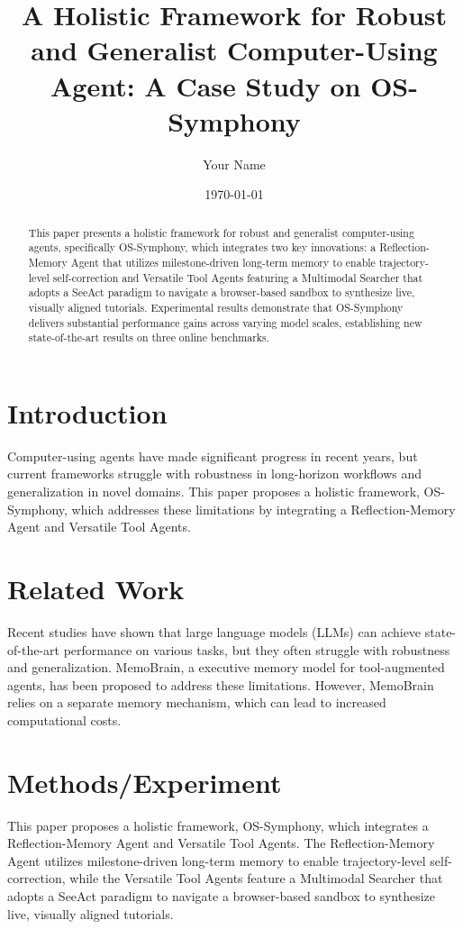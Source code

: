 \documentclass{article}
\begin{document}
\title{A Holistic Framework for Robust and Generalist Computer-Using Agent: A Case Study on OS-Symphony}
\author{Your Name}
\date{\today}

\maketitle

\begin{abstract}
This paper presents a holistic framework for robust and generalist computer-using agents, specifically OS-Symphony, which integrates two key innovations: a Reflection-Memory Agent that utilizes milestone-driven long-term memory to enable trajectory-level self-correction and Versatile Tool Agents featuring a Multimodal Searcher that adopts a SeeAct paradigm to navigate a browser-based sandbox to synthesize live, visually aligned tutorials. Experimental results demonstrate that OS-Symphony delivers substantial performance gains across varying model scales, establishing new state-of-the-art results on three online benchmarks.
\end{abstract}

\section{Introduction}
Computer-using agents have made significant progress in recent years, but current frameworks struggle with robustness in long-horizon workflows and generalization in novel domains. This paper proposes a holistic framework, OS-Symphony, which addresses these limitations by integrating a Reflection-Memory Agent and Versatile Tool Agents.

\section{Related Work}
Recent studies have shown that large language models (LLMs) can achieve state-of-the-art performance on various tasks, but they often struggle with robustness and generalization. MemoBrain, a executive memory model for tool-augmented agents, has been proposed to address these limitations. However, MemoBrain relies on a separate memory mechanism, which can lead to increased computational costs.

\section{Methods/Experiment}
This paper proposes a holistic framework, OS-Symphony, which integrates a Reflection-Memory Agent and Versatile Tool Agents. The Reflection-Memory Agent utilizes milestone-driven long-term memory to enable trajectory-level self-correction, while the Versatile Tool Agents feature a Multimodal Searcher that adopts a SeeAct paradigm to navigate a browser-based sandbox to synthesize live, visually aligned tutorials.
\end{document}
